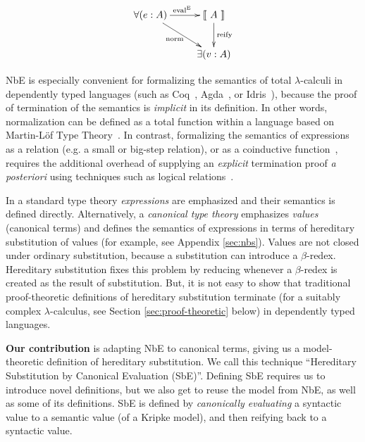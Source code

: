 \documentclass[runningheads,a4paper]{llncs}
\newcommand{\refapp}[1]{Appendix \ref{sec:#1}}
\newcommand{\refsec}[1]{Section \ref{sec:#1}}
\def\eval{\fun{eval}^\con{E}}
\newcommand{\els}[1]{\llbracket ~ #1 ~ \rrbracket}
\newcommand{\con}[1]{\textmd{#1}}
\newcommand{\fun}[1]{\textmd{#1}}
\begin{document}
\begin{displaymath}
    \xymatrix{
          {\forall (e : A)} 
          \ar[dr]_{\fun{norm}}
          \ar[r]^{\eval}
        & {\els{A}}
          \ar[d]^{\large{\fun{reify}}}
\\      & \exists (v : A) }
\end{displaymath}

NbE is especially convenient for formalizing the semantics of total
$\lambda$-calculi in dependently typed languages (such as
Coq~\cite{coq08}, Agda~\cite{norell2007towards}, or Idris~\cite{brady2011idris}), because the
proof of termination of the semantics is \textit{implicit} in its
definition. In other words, normalization can be defined as a total
function within a language based on
Martin-L{\"o}f Type Theory~\cite{martinintuitionistic,martin1975intuitionistic,nordstrom1990programming}.
In contrast, formalizing the semantics of expressions as a
relation (e.g. a small or big-step relation), or as a
coinductive function~\cite{coinductivenbe}, requires the additional overhead
of supplying an \textit{explicit}
termination proof \textit{a posteriori} using techniques such as
logical relations~\cite{plotkinlogrel}.

In a standard type theory \textit{expressions} are emphasized and
their semantics is defined directly. Alternatively, a
\textit{canonical type theory} emphasizes \textit{values} (canonical terms) and defines
the semantics of expressions in terms of hereditary substitution of
values (for example, see \refapp{nbs}). 
Values are not closed under ordinary substitution, because a
substitution can introduce a $\beta$-redex. Hereditary substitution
fixes this problem by reducing whenever a $\beta$-redex is created as
the result of substitution. But, it is not easy to show that
traditional proof-theoretic definitions of hereditary substitution 
terminate (for a suitably complex $\lambda$-calculus, see
\refsec{proof-theoretic} below)
in dependently typed languages.

\textbf{Our contribution} is adapting NbE to canonical terms, giving us a model-theoretic
definition of hereditary substitution. We call this technique
``Hereditary Substitution by Canonical Evaluation (SbE)''. Defining
SbE requires us to introduce novel definitions, but we also get to
reuse the model from NbE, as well as some of its definitions. SbE is
defined by \textit{canonically evaluating} a syntactic value to a
semantic value (of a Kripke model), and then reifying back to a syntactic value.
\end{document}
